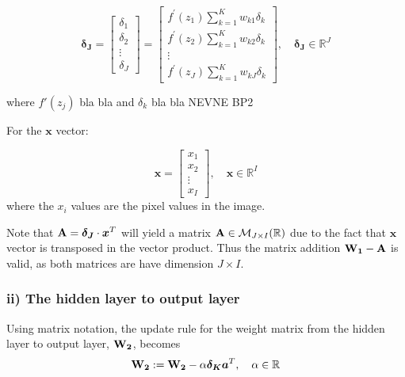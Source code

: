 \documentclass{article}
\begin{document}
\begin{equation}
    \boldsymbol{\delta_J} = 
    \begin{bmatrix}
        \delta_1 \\
        \delta_2 \\
        \vdots \\
        \delta_J
    \end{bmatrix}
    = \begin{bmatrix}
        f^{\prime}\left(z_{1}\right) \sum_{k=1}^K w_{k 1} \delta_{k} \\
        f^{\prime}\left(z_{2}\right) \sum_{k=1}^K w_{k 2} \delta_{k} \\
        \vdots \\
        f^{\prime}\left(z_{J}\right) \sum_{k=1}^K w_{k J} \delta_{k}
    \end{bmatrix}
    , \quad \boldsymbol{\delta_J} \in \mathbb{R}^J
\end{equation}

where $f'(z_j)$ bla bla and $\delta_k$ bla bla NEVNE BP2

For the $\boldsymbol{x}$ vector:

\begin{equation}
    \boldsymbol{x} = 
    \begin{bmatrix}
        x_1 \\
        x_2 \\
        \vdots \\
        x_I
    \end{bmatrix}
    , \quad \boldsymbol{x} \in \mathbb{R}^I
\end{equation}
where the $x_i$ values are the pixel values in the image.

Note that $\text{\textbf{A}} = \boldsymbol{\delta_J} \cdot \boldsymbol{x}^T$ will yield a matrix $\text{\textbf{A}} \in \mathcal{M}_{J \times I}(\mathbb{R})$ due to the fact that $\boldsymbol{x}$ vector is transposed in the vector product. Thus the matrix addition $\text{\textbf{W}}_\textbf{1} - \text{\textbf{A}}$ is valid, as both matrices are have dimension $J \times I$.  


\subsubsection*{ii) The hidden layer to output layer} 
Using matrix notation, the update rule for the weight matrix from the hidden layer to output layer, $\text{\textbf{W}}_\textbf{2}$, becomes 
\begin{equation}
    \text{\textbf{W}}_\textbf{2} := \text{\textbf{W}}_\textbf{2} - \alpha \boldsymbol{\delta_K} \boldsymbol{a}^T,\quad \alpha \in \mathbb{R}
    \label{eq:matrix_output}
\end{equation}
\end{document}
